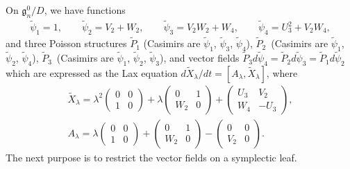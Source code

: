 \documentclass[pdftex]{sigma}
\numberwithin{equation}{section}
\begin{document}
On $\mathfrak{g}^0_n/D$, we have functions
\begin{gather*}
\widetilde{\psi}_1 = 1, \qquad \widetilde{\psi}_2 = V_2 + W_2 , \qquad
\widetilde{\psi}_3 = V_2W_2 + W_4, \qquad \widetilde{\psi}_4 = U_3^2 + V_2W_4,
\end{gather*}
and three Poisson structures $\widetilde{P}_1$ (Casimirs are $\widetilde{\psi}_1$, $\widetilde{\psi}_3$, $\widetilde{\psi}_4$), $\widetilde{P}_2$~(Casimirs are $\widetilde{\psi}_1$, $\widetilde{\psi}_2$, $\widetilde{\psi}_4$), $\widetilde{P}_3$~(Casimirs are $\widetilde{\psi}_1$, $\widetilde{\psi}_2$, $\widetilde{\psi}_3$), and vector f\/ields $\widetilde{P}_3d\widetilde{\psi}_4 = \widetilde{P}_2 d\widetilde{\psi}_3 = \widetilde{P}_1d\widetilde{\psi}_2$
which are expressed as the Lax equation $d\widetilde{X}_\lambda /dt = [A_\lambda, \widetilde{X}_\lambda ]$, where
\begin{gather*}
\widetilde{X}_\lambda = \lambda ^2 \left(
\begin{matrix}
0 & 0 \\
1 & 0
\end{matrix}
\right) + \lambda \left(
\begin{matrix}
0 & 1 \\
W_2 & 0
\end{matrix}
\right) + \left(
\begin{matrix}
U_3 & V_2 \\
W_4 & -U_3
\end{matrix}
\right), \\
A_\lambda = \lambda \left(
\begin{matrix}
0 & 0 \\
1 & 0
\end{matrix}
\right) + \left(
\begin{matrix}
0 & 1 \\
W_2 & 0
\end{matrix}
\right) - \left(
\begin{matrix}
0 & 0 \\
V_2 & 0
\end{matrix}
\right).
\end{gather*}
The next purpose is to restrict the vector f\/ields on a symplectic leaf.
\end{document}
